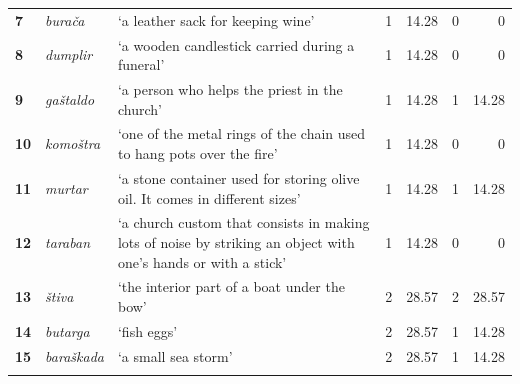 \documentclass[output=paper]{LSP/langsci}
\begin{document}
\begin{table}
{\begin{tabular}{lp{2cm}p{5cm}lrlr}
{\bfseries 7} & {\itshape burača} & `a leather sack for keeping wine' & 1 & 14.28 & 0 & 0\\

{\bfseries 8} & {\itshape dumplir} & `a wooden candlestick carried during a funeral' & 1 & 14.28 & 0 & 0\\

{\bfseries 9} & {\itshape gaštaldo} & `a person who helps the priest in the church' & 1 & 14.28 & 1 & 14.28\\

{\bfseries 10} & {\itshape komoštra} & `one of the metal rings of the chain used to hang pots over the fire' & 1 & 14.28 & 0 & 0\\

{\bfseries 11} & {\itshape murtar} & `a stone container used for storing olive oil. It comes in different sizes' & 1 & 14.28 & 1 & 14.28\\

{\bfseries 12} & {\itshape taraban} & `a church custom that consists in making lots of noise by striking an object with one's hands or with a stick' & 1 & 14.28 & 0 & 0\\

{\bfseries 13} & {\itshape štiva} & ‘the interior part of a boat under the bow' & 2 & 28.57 & 2 & 28.57\\

{\bfseries 14} & {\itshape butarga} & `fish eggs' & 2 & 28.57 & 1 & 14.28\\

{\bfseries 15} & {\itshape baraškada} & `a small sea storm' & 2 & 28.57 & 1 & 14.28\\

\lspbottomrule
\end{tabular}
}
\end{table}
\end{document}
